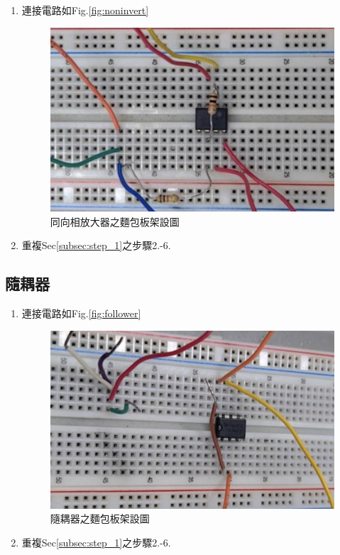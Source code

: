 \documentclass[12pt,a4paper]{article}
\begin{document}
\begin{CJK}{UTF8}{bkai}
\begin{enumerate}
    \item 連接電路如Fig.\ref{fig:noninvert}
    \begin{figure}[h]
        \centering
        \includegraphics[width=0.7\linewidth]{figures/exp_2_step1.png}
        \caption{同向相放大器之麵包板架設圖}
        \label{fig:exp_2_step1}
    \end{figure}
    \item 重複Sec\ref{subsec:step_1}之步驟2.-6.
\end{enumerate}



\subsection{隨耦器}
\hfill

\begin{enumerate}
    \item 連接電路如Fig.\ref{fig:follower}
    \begin{figure}[h]
        \centering
        \includegraphics[width=0.7\linewidth]{figures/exp_3_step1.png}
        \caption{隨耦器之麵包板架設圖}
        \label{fig:exp_3_step1}
    \end{figure}
    \item 重複Sec\ref{subsec:step_1}之步驟2.-6.
\end{enumerate}


\end{CJK}
\end{document}
